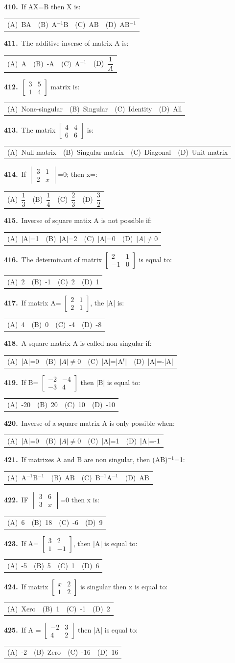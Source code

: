 \documentclass[11pt,a4paper]{article}
\makeatletter
\newcommand{\mcq}[6]{%
  \Needspace{4\baselineskip}%
  \par\medskip\noindent\textbf{#1.}\ #2\par\nopagebreak
  \noindent\begin{tabularx}{\linewidth}{@{\hspace{1.5em}}*{4}{>{\raggedright\arraybackslash}X}@{}}
    (A)~#3 & (B)~#4 & (C)~#5 & (D)~#6
  \end{tabularx}\par}
\makeatother
\begin{document}
\mcq{410}{If AX=B then X is:}{BA}{A$^{-1}$B}{AB}{AB$^{-1}$}
\mcq{411}{The additive inverse of matrix A is:}{A}{-A}{A$^{-1}$}{$\dfrac{1}{A}$}
\mcq{412}{$\begin{bmatrix}3&5\\1&4\end{bmatrix}$ matrix is:}{None-singular}{Singular}{Identity}{All}
\mcq{413}{The matrix $\begin{bmatrix}4&4\\6&6\end{bmatrix}$ is:}{Null matrix}{Singular matrix}{Diagonal}{Unit matrix}
\mcq{414}{If $\begin{vmatrix}3&1\\2&x\end{vmatrix}$=0; then x=:}{$\dfrac{1}{3}$}{$\dfrac{1}{4}$}{$\dfrac{2}{3}$}{$\dfrac{3}{2}$}
\mcq{415}{Inverse of square matix A is not possible if:}{|A|=1}{|A|=2}{|A|=0}{$|A|\neq0$}
\mcq{416}{The determinant of matrix $\begin{bmatrix}2&1\\-1&0\end{bmatrix}$ is equal to:}{2}{-1}{2}{1}
\mcq{417}{If matrix A= $\begin{bmatrix}2&1\\2&1\end{bmatrix}$, the |A| is:}{4}{0}{-4}{-8}
\mcq{418}{A square matrix A is called non-singular if:}{|A|=0}{$|A|\neq0$}{|A|=|A$^{t}$|}{|A|=-|A|}
\mcq{419}{If B= $\begin{bmatrix}-2&-4\\-3&4\end{bmatrix}$ then |B| is equal to:}{-20}{20}{10}{-10}
\mcq{420}{Inverse of a square matrix A is only possible when:}{|A|=0}{$|A|\neq0$}{|A|=1}{|A|=-1}
\mcq{421}{If matrixes A and B are non singular, then (AB)$^{-1}$=1:}{A$^{-1}$B$^{-1}$}{AB}{B$^{-1}$A$^{-1}$}{AB}
\mcq{422}{IF $\begin{vmatrix}3&6\\3&x\end{vmatrix}$=0 then x is:}{6}{18}{-6}{9}
\mcq{423}{If A= $\begin{bmatrix}3&2\\1&-1\end{bmatrix}$, then |A| is equal to:}{-5}{5}{1}{6}
\mcq{424}{If matrix $\begin{bmatrix}x&2\\1&2\end{bmatrix}$ is singular then x is equal to:}{Xero}{1}{-1}{2}
\mcq{425}{If A = $\begin{bmatrix}-2&3\\4&2\end{bmatrix}$ then |A| is equal to:}{-2}{Zero}{-16}{16}
\end{document}
